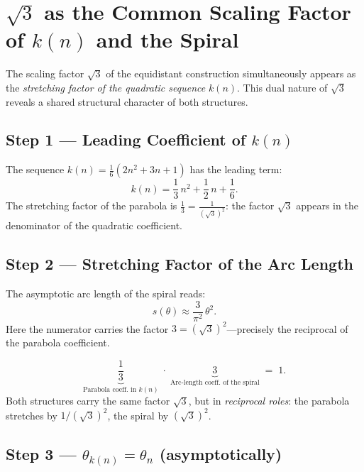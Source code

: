 \section{\texorpdfstring{$\sqrt{3}$}{sqrt(3)} as the Common Scaling Factor of \texorpdfstring{$k(n)$}{k(n)} and the Spiral}

The scaling factor $\sqrt{3}$ of the equidistant
construction simultaneously appears as the \emph{stretching factor of
the quadratic sequence} $k(n)$. This dual nature of $\sqrt{3}$
reveals a shared structural character of both structures.

\subsection{Step 1 --- Leading Coefficient of \texorpdfstring{$k(n)$}{k(n)}}

The sequence $k(n) = \tfrac{1}{6}(2n^2 + 3n + 1)$ has the leading term:
\[
  k(n) = \frac{1}{3}\,n^2 + \frac{1}{2}\,n + \frac{1}{6}.
\]
The stretching factor of the parabola is $\tfrac{1}{3} = \tfrac{1}{(\sqrt{3})^2}$:
the factor $\sqrt{3}$ appears in the denominator of the quadratic coefficient.

\subsection{Step 2 --- Stretching Factor of the Arc Length}

The asymptotic arc length of the spiral reads:
\[
  s(\theta) \approx \frac{3}{\pi^2}\,\theta^2.
\]
Here the numerator carries the factor $3 = (\sqrt{3})^2$---precisely the
reciprocal of the parabola coefficient.

\begin{tcolorbox}[
  colback=blue!3, colframe=blue!40!black, enhanced,
  title={Reciprocal Relationship of the Stretching Factors}]
\[
  \underbrace{\frac{1}{3}}_{\text{Parabola coeff.\ in }k(n)}
  \;\cdot\;
  \underbrace{3}_{\text{Arc-length coeff.\ of the spiral}}
  \;=\; 1.
\]
Both structures carry the same factor $\sqrt{3}$, but in
\emph{reciprocal roles}: the parabola stretches by $1/(\sqrt{3})^2$,
the spiral by $(\sqrt{3})^2$.
\end{tcolorbox}

\subsection{Step 3 --- \texorpdfstring{$\theta_{k(n)} = \theta_n$}{Angular Agreement} (asymptotically)}

